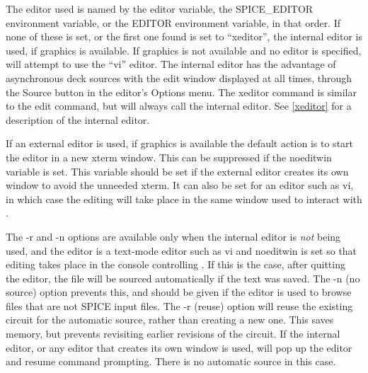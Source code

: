 The editor used is named by the {\et editor} variable, the {\et
SPICE\_EDITOR} environment variable, or the {\et EDITOR} environment
variable, in that order.  If none of these is set, or the first one
found is set to ``{\vt xeditor}'', the internal editor is used, if
graphics is available.  If graphics is not available and no editor is
specified, {\WRspice} will attempt to use the ``{\vt vi}'' editor. 
The internal editor has the advantage of asynchronous deck sources
with the edit window displayed at all times, through the {\cb Source}
button in the editor's {\cb Options} menu.  The {\cb xeditor} command
is similar to the {\cb edit} command, but will always call the
internal editor.  See \ref{xeditor} for a description of the internal
editor.

If an external editor is used, if graphics is available the default
action is to start the editor in a new {\vt xterm} window.  This can
be suppressed if the {\et noeditwin} variable is set.  This variable
should be set if the external editor creates its own window to avoid
the unneeded {\vt xterm}.  It can also be set for an editor such as
{\vt vi}, in which case the editing will take place in the same window
used to interact with {\WRspice}.

The {\vt -r} and {\vt -n} options are available only when the internal
editor is {\it not} being used, and the editor is a text-mode editor
such as {\vt vi} and {\et noeditwin} is set so that editing takes
place in the console controlling {\WRspice}.  If this is the case,
after quitting the editor, the file will be sourced automatically if
the text was saved.  The {\vt -n} (no source) option prevents this,
and should be given if the editor is used to browse files that are not
SPICE input files.  The {\vt -r} (reuse) option will reuse the
existing circuit for the automatic source, rather than creating a new
one.  This saves memory, but prevents revisiting earlier revisions of
the circuit.  If the internal editor, or any editor that creates its
own window is used, {\WRspice} will pop up the editor and resume
command prompting.  There is no automatic source in this case.

\subsection{}


